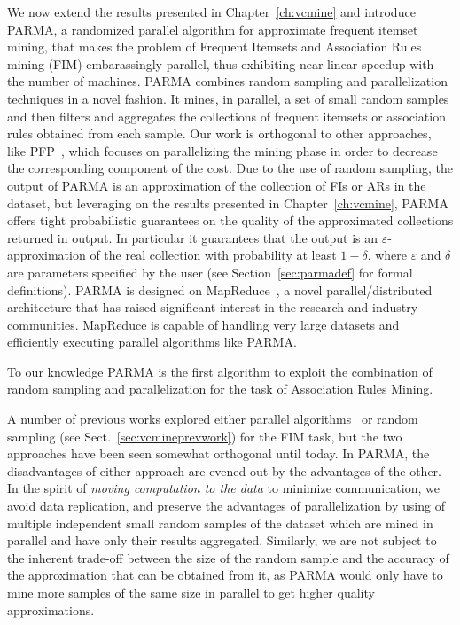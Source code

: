 We now extend the results presented in Chapter~\ref{ch:vcmine} and introduce
PARMA, a randomized parallel algorithm for approximate frequent itemset mining,
that makes the problem of Frequent Itemsets and Association Rules mining (FIM)
embarassingly parallel, thus exhibiting near-linear speedup with the number of
machines. PARMA combines random sampling and parallelization techniques in a
novel fashion.  It mines, in parallel, a set of small random samples and then
filters and aggregates the collections of frequent itemsets or association rules
obtained from each sample.  Our work is orthogonal to other approaches, like
PFP~\citep{LiWZZC08}, which focuses on parallelizing the mining phase in order
to decrease the corresponding component of the cost. Due to the use of random
sampling, the output of PARMA is an approximation of
the collection of FIs or ARs in the dataset, but leveraging on the results
presented in
Chapter~\ref{ch:vcmine}, PARMA offers tight probabilistic guarantees on the
quality of the approximated collections returned in output. In particular it
guarantees that the output is an $\varepsilon$-approximation of the real
collection with probability at least $1-\delta$, where $\varepsilon$ and
$\delta$ are parameters specified by the user (see Section~\ref{sec:parmadef} for
formal definitions). 
PARMA is designed on
MapReduce~\citep{DeanG08}, a novel parallel/distributed architecture that has
raised significant interest in the research and industry communities. MapReduce
is capable of handling very large datasets and efficiently executing parallel
algorithms like PARMA.

To our knowledge PARMA is the first algorithm to exploit the combination of
random sampling and parallelization for the task of Association Rules Mining. 

A number of previous works explored either parallel
algorithms~\citep{BuehrerPTKS07,CongHHP05,EHZaiane06,FangEtAl08,LiuLZT07,OzkuralUA11,JinYA05,Zaki99}
or random
sampling (see Sect.~\ref{sec:vcmineprevwork})
for the FIM task, but the two approaches have been seen somewhat orthogonal
until today. In PARMA, the disadvantages of either approach are evened out by
the advantages of the other. In the spirit of \emph{moving computation to the
data} to minimize communication, we avoid data replication, and preserve the
advantages of parallelization by using of multiple independent small random
samples of the dataset which are mined in parallel and have only their results
aggregated. Similarly, we are not subject to the inherent trade-off between the
size of the random sample and the accuracy of the approximation that can be
obtained from it, as PARMA would only have to mine more samples of the same size
in parallel to get higher quality approximations.

